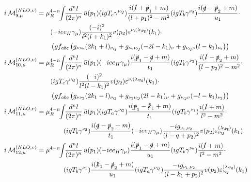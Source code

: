 \begin{align}
i\Md^{(NLO,v)}_{9,\mu} &=\mu_R^{4-n}\!\!\int\!\!\frac{d^nl}{(2\pi)^n}\,\bar u(p_1)(igT_c\gamma^{\nu_Q})\frac{i(\slashed{l}+\slashed{p}_1+m)}{(l+p_1)^2-m^2}(igT_b\gamma^{\nu_2})\frac{i(\slashed{q}-\slashed{p}_2+m)}{u_1}\cdot\nonumber\\
 &\hspace{20pt}(-i e e_H \gamma_\mu)\frac{(-i)^2}{l^2(l+k_1)^2}v(p_2)\varepsilon^{\nu,(\lambda_{\Pg})}(k_1)\cdot\nonumber\\
 &\hspace{20pt}\left(gf_{abc}\left(g_{\nu\nu_2}(2k_1+l)_{\nu_Q}+g_{\nu_2\nu_Q}(-2l-k_1)_{\nu}+g_{\nu_Q\nu}(l-k_1)_{\nu_2}\right)\right)\\
i\Md^{(NLO,v)}_{10,\mu} &=\mu_R^{4-n}\!\!\int\!\!\frac{d^nl}{(2\pi)^n}\,\bar u(p_1)(-i e e_H \gamma_\mu)\frac{i(\slashed{p}_1-\slashed{q}+m)}{t_1}(igT_b\gamma^{\nu_2})\frac{i(\slashed{l}-\slashed{p}_2+m)}{(l-p_2)^2-m^2}\cdot\nonumber\\
 &\hspace{20pt}(igT_c\gamma^{\nu_Q})\frac{(-i)^2}{l^2(l-k_1)^2}v(p_2)\varepsilon^{\nu,(\lambda_{\Pg})}(k_1)\cdot\nonumber\\
 &\hspace{20pt}\left(gf_{abc}\left(g_{\nu\nu_2}(2k_1-l)_{\nu_Q}+g_{\nu_2\nu_Q}(2l-k_1)_{\nu}+g_{\nu_Q\nu}(-l-k_1)_{\nu_2}\right)\right)\\
i\Md^{(NLO,v)}_{11,\mu} &=\mu_R^{4-n}\!\!\int\!\!\frac{d^nl}{(2\pi)^n}\,\bar u(p_1)(igT_a\gamma^{\nu_Q})\frac{i(\slashed{p}_1-\slashed{k}_1+m)}{t_1}(igT_b\gamma^{\nu_1})\frac{i(\slashed{l}+m)}{l^2-m^2}\cdot\nonumber\\
 &\hspace{40pt}(igT_b\gamma^{\nu_2})\frac{i(\slashed{q}-\slashed{p}_2+m)}{t_1}(-i e e_H \gamma_\mu)\frac{-ig_{\nu_1,\nu_2}}{(l-q+p_2)^2}v(p_2)\varepsilon^{(\lambda_{\Pg})}_{\nu_Q}(k_1)\\
i\Md^{(NLO,v)}_{12,\mu} &=\mu^{4-n}\!\!\int\!\!\frac{d^nl}{(2\pi)^n}\,\bar u(p_1)(-i e e_H \gamma_\mu)\frac{i(\slashed{p}_1-\slashed{q}+m)}{u_1}(igT_b\gamma^{\nu_2})\frac{i(\slashed{l}+m)}{l^2-m^2}\cdot\nonumber\\
 &\hspace{40pt}(igT_b\gamma^{\nu_1})\frac{i(\slashed{k}_1-\slashed{p}_2+m)}{u_1}(igT_a\gamma^{\nu_Q})\frac{-ig_{\nu_1,\nu_2}}{(l-k_1+p_2)^2}v(p_2)\varepsilon^{(\lambda_{\Pg})}_{\nu_Q}(k_1)
\end{align}

